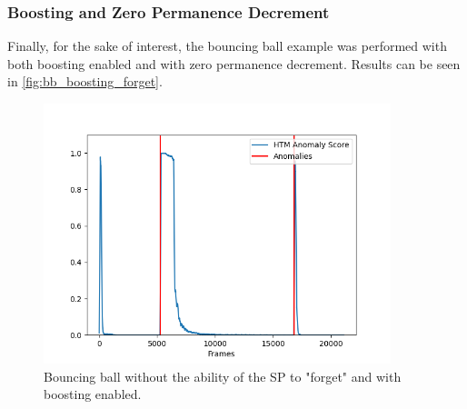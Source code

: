 \subsubsection{Boosting and Zero Permanence Decrement}
Finally, for the sake of interest, the bouncing ball example was performed with both boosting enabled and with zero permanence decrement. Results can be seen in \autoref{fig:bb_boosting_forget}.
\begin{figure}[H]
    \centering
    \includegraphics[width=0.9\textwidth]{resources/experiments/bouncing_ball/bb_anoms_unforgetting_boosting.png}
    \caption{Bouncing ball without the ability of the SP to "forget" and with boosting enabled.}
    \label{fig:bb_boosting_forget}
\end{figure}
